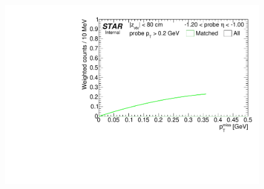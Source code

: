 \begin{figure}[ht]
{  \includegraphics[width=\linewidth,page=11]{graphics/systematicsEfficiency/TOF_tagAndProbe/Fitting_effVsEta_mc.CPT.pdf}
}%
\end{figure}



